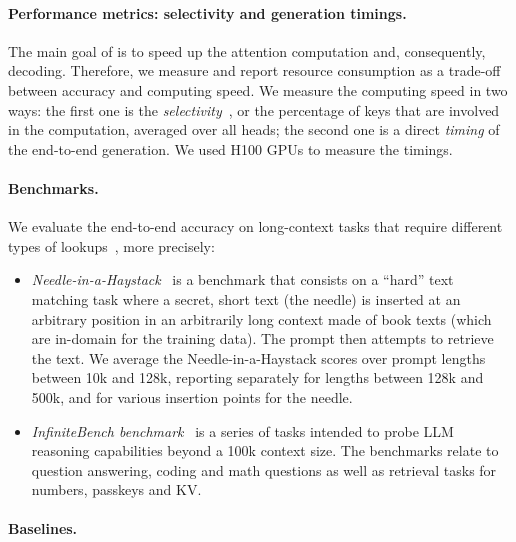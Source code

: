 %
%
%
%


%

%

%
\paragraph{Performance metrics: selectivity and generation timings. }
The main goal of \OURS is to speed up the attention computation and, consequently, decoding.
Therefore, we measure and report resource consumption as a trade-off between accuracy and computing speed. 
We measure the computing speed in two ways: 
the first one is the \emph{selectivity}~\citep{zhuoming2024magicpig,pauleve2010locality}, or the percentage of keys that are involved in the computation, averaged over all heads; 
the second one is a direct \emph{timing} of the end-to-end generation.
We used H100 GPUs to measure the timings.

%
%
%

\paragraph{Benchmarks.}

We evaluate the end-to-end accuracy on long-context tasks that require different types of lookups~\citep{li2024evaluating}, more precisely:
 \begin{itemize}
\item 
\textit{Needle-in-a-Haystack}~\citep{NIHGithubURL} is a benchmark that consists on a ``hard'' text matching task where a secret, short text (the needle) is inserted at an arbitrary position in an arbitrarily long context made of book texts (which are in-domain for the training data). 
The prompt then attempts to retrieve the text.
We average the Needle-in-a-Haystack scores over prompt lengths between 10k and 128k,  reporting separately for lengths between 128k and 500k, and for various insertion points for the needle. 

%
%
\item
\textit{InfiniteBench benchmark}~\citep{zhang2024infinitybench} is a series of tasks intended to probe LLM reasoning capabilities beyond a 100k context size. 
The benchmarks relate to question answering, coding and math questions as well as retrieval tasks for numbers, passkeys and KV.
%
%
%
%
\end{itemize}


\paragraph{Baselines.} 

